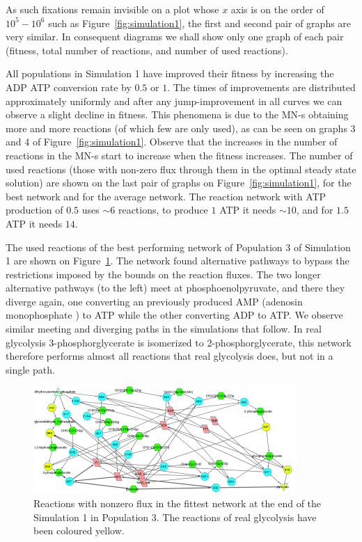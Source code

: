 \documentclass[a4paper,12pt]{article}
\begin{document}
As such fixations remain invisible on a plot whose $x$ axis is on the order of $10^5-10^6$ such as Figure~\ref{fig:simulation1}, the first and second pair of graphs are very similar. In consequent diagrams we shall show only one graph of each pair (fitness, total number of reactions, and number of used reactions).

All populations in Simulation 1 have improved their fitness by increasing the ADP ATP conversion rate by $0.5$ or $1$. The times of improvements are distributed approximately uniformly and after any jump-improvement in all curves we can observe a slight decline in fitness. This phenomena is due to the MN-s obtaining more and more reactions (of which few are only used), as can be seen on graphs 3 and 4 of Figure~\ref{fig:simulation1}. Observe that the increases in the number of reactions in the MN-s start to increase when the fitness increases. The number of used reactions (those with non-zero flux through them in the optimal steady state solution) are shown on the last pair of graphs on Figure~\ref{fig:simulation1}, for the best network and for the average network. The reaction network with ATP production of $0.5$ uses $\sim 6$ reactions, to produce $1$ ATP it needs $\sim 10$, and for $1.5$ ATP it needs $14$. 

The used reactions of the best performing network of Population 3 of Simulation 1 are shown on Figure~\ref{fig:trunk_glyc_final_job1}. The network found alternative pathways to bypass the restrictions imposed by the bounds on the reaction fluxes. The two longer alternative pathways (to the left) meet at phosphoenolpyruvate, and there they diverge again, one converting an previously produced AMP (adenosin monophosphate ) to ATP while the other converting ADP to ATP. We observe similar meeting and diverging paths in the simulations that follow. In real glycolysis 3-phosphorglycerate is isomerized to 2-phosphorglycerate, this network therefore performs almost all reactions that real glycolysis does, but not in a single path. 



\begin{figure}[htpb]
	\centering
	\includegraphics[width=1\linewidth]{trunk_glyc_final_job1_colored.pdf}
	\caption{Reactions with nonzero flux in the fittest network at the end of the Simulation 1 in Population 3. The reactions of real glycolysis have been coloured yellow. }
	\label{fig:trunk_glyc_final_job1}
\end{figure}
\end{document}
